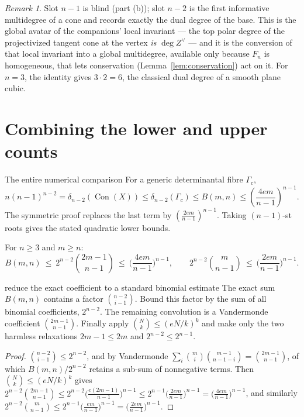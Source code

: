 \documentclass[acmsmall,screen,nonacm]{acmart}
\theoremstyle{definition}
\theoremstyle{remark}
\newtheorem{remark}{Remark}[section]
\DeclareMathOperator{\Con}{Con}
\newcommand{\pdeg}{\delta}
\begin{document}
\begin{remark}
Slot $n-1$ is blind (part (b)); slot $n-2$ is the first informative
multidegree of a cone and records exactly the dual degree of the base.
This is the global avatar of the companions' local invariant --- the
top polar degree of the projectivized tangent cone at the vertex
\emph{is} $\deg Z^\vee$ --- and it is the conversion of that local
invariant into a global multidegree, available only because $F_n$ is
homogeneous, that lets conservation
(Lemma~\ref{lem:conservation}) act on it.  For $n=3$, the identity gives $3\cdot2=6$, the classical dual degree of a smooth plane cubic.
\end{remark}

\section{Combining the lower and upper counts}\label{sec:proofs}

\begin{readerbox}{The entire numerical comparison}
For a generic determinantal fibre $\Gamma_c$,
\[
 n(n-1)^{n-2}
 =\pdeg_{n-2}(\Con(X))
 \le \pdeg_{n-2}(\Gamma_c)
 \le B(m,n)
 \le \left(\frac{4em}{n-1}\right)^{n-1}.
\]
The symmetric proof replaces the last term by $\left(\frac{2em}{n-1}\right)^{n-1}$.  Taking $(n-1)$-st roots gives the stated quadratic lower bounds.
\end{readerbox}

\begin{lemma}[Estimates]\label{lem:estimates}
For $n\ge3$ and $m\ge n$:
\[
  B(m,n)\ \le\ 2^{n-2}\binom{2m-1}{n-1}\ \le\
  \Big(\frac{4em}{n-1}\Big)^{n-1},
  \qquad
  2^{n-2}\binom{m}{n-1}\ \le\ \Big(\frac{2em}{n-1}\Big)^{n-1}.
\]
\end{lemma}

\begin{roadmapbox}{reduce the exact coefficient to a standard binomial estimate}
The exact sum $B(m,n)$ contains a factor $\binom{n-2}{i-1}$.  Bound this
factor by the sum of all binomial coefficients, $2^{n-2}$.  The remaining
convolution is a Vandermonde coefficient
$\binom{2m-1}{n-1}$.  Finally apply
$\binom Nk\le(eN/k)^k$ and make only the two harmless relaxations
$2m-1\le2m$ and $2^{n-2}\le2^{n-1}$.
\end{roadmapbox}

\begin{proof}
$\binom{n-2}{i-1}\le2^{n-2}$, and by Vandermonde
$\sum_{i}\binom{m}{i}\binom{m-1}{n-1-i}=\binom{2m-1}{n-1}$, of which
$B(m,n)/2^{n-2}$ retains a sub-sum of nonnegative terms.  Then
$\binom{N}{k}\le(eN/k)^k$ gives
$2^{n-2}\binom{2m-1}{n-1}
\le2^{n-2}\big(\tfrac{e(2m-1)}{n-1}\big)^{n-1}
\le2^{n-1}\big(\tfrac{2em}{n-1}\big)^{n-1}
=\big(\tfrac{4em}{n-1}\big)^{n-1}$, and similarly
$2^{n-2}\binom{m}{n-1}\le2^{n-1}\big(\tfrac{em}{n-1}\big)^{n-1}
=\big(\tfrac{2em}{n-1}\big)^{n-1}$.
\end{proof}
\end{document}
